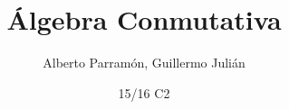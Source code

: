 \documentclass[palatino]{apuntes}
\title{Álgebra Conmutativa}
\author{Alberto Parramón, Guillermo Julián}
\date{15/16 C2}
\begin{document}
\pagestyle{plain}
\maketitle

\renewcommand{\chaptername}{Tema}

\renewcommand\thechapter{\arabic{chapter}}

\newcommand{\field}{\ensuremath{\mathbb{F}}\xspace}
\newcommand{\K}{\ensuremath{\mathbb{K}}\xspace}
\renewcommand\tq{:}
\renewcommand{\U}{\ensuremath{\mathcal{U}}\xspace}
\newcommand{\zero}{\ensuremath{\mathbb{0}}\xspace}
\newcommand{\one}{\ensuremath{\mathbb{1}}\xspace}
\newcommand{\cls}{\gor} %
\newcommand{\nil}{\mop{Nil}}

\newcommand{\zerogen}{\ensuremath{\mathopen{\langle} \zero \mathclose{\rangle}}} %

\newcommand{\st}{\text{ tal que }}
\newcommand{\wrt}{\text{ con respecto de }}
\newcommand{\ie}{\text{, es decir, }}

\tableofcontents
\newpage




\appendix




\nocite{reidAG,reidCA}
{}

\printindex
\end{document}
